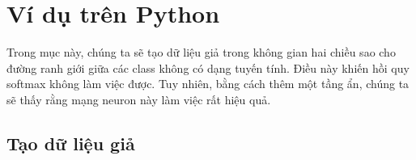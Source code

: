 

\section{Ví dụ trên Python}



Trong mục này, chúng ta sẽ tạo dữ liệu giả trong không gian hai chiều sao cho
đường ranh giới giữa các class {không} có dạng tuyến tính. Điều này khiến hồi
quy softmax không làm việc được. Tuy nhiên, bằng cách thêm một tầng ẩn, chúng ta
sẽ thấy rằng mạng neuron này làm việc rất hiệu quả.

\subsection{Tạo dữ liệu giả}






